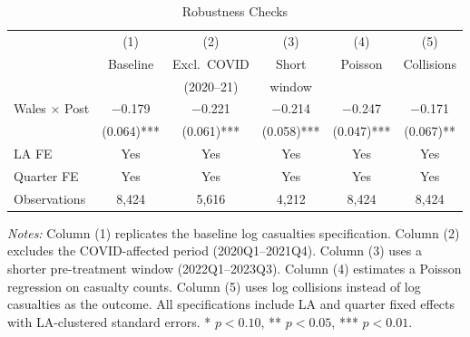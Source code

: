\begin{table}[H]
\centering
\caption{Robustness Checks}
\label{tab:robustness}
\begin{threeparttable}
\begin{tabular}{lccccc}
\toprule
& (1) & (2) & (3) & (4) & (5) \\
& Baseline & Excl.\ COVID & Short & Poisson & Collisions \\
& & (2020--21) & window & & \\
\midrule
Wales $\times$ Post & $-$0.179 & $-$0.221 & $-$0.214 & $-$0.247 & $-$0.171 \\
& (0.064)*** & (0.061)*** & (0.058)*** & (0.047)*** & (0.067)** \\
\midrule
LA FE & Yes & Yes & Yes & Yes & Yes \\
Quarter FE & Yes & Yes & Yes & Yes & Yes \\
Observations & 8,424 & 5,616 & 4,212 & 8,424 & 8,424 \\
\bottomrule
\end{tabular}
\begin{tablenotes}[flushleft]
\small
\item \textit{Notes:} Column (1) replicates the baseline log casualties specification. Column (2) excludes the COVID-affected period (2020Q1--2021Q4). Column (3) uses a shorter pre-treatment window (2022Q1--2023Q3). Column (4) estimates a Poisson regression on casualty counts. Column (5) uses log collisions instead of log casualties as the outcome. All specifications include LA and quarter fixed effects with LA-clustered standard errors. * $p<0.10$, ** $p<0.05$, *** $p<0.01$.
\end{tablenotes}
\end{threeparttable}
\end{table}

